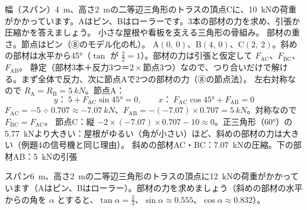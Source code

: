 \begin{phreidai}[三角トラスを節点法で解く]
\label{ph:力-5:ex11}幅（スパン）\qty{4}{m}、高さ\qty{2}{m}の二等辺三角形のトラスの頂点Cに、\qty{10}{kN}の荷重がかかっています。Aはピン、Bはローラーです。3本の部材の力を求め、引張か圧縮かを答えましょう。
\phbamen
小さな屋根や看板を支える三角形の骨組み。
\phmushi
部材の重さ。節点はピン（⑧のモデル化の札）。
\phzu
A$(0,\ 0)$、B$(4,\ 0)$、C$(2,\ 2)$。斜めの部材は水平から45°（$\tan$ が $\tfrac{2}{2}=1$）。部材の力は引張と仮定して $F_{\mathrm{AC}}$、$F_{\mathrm{BC}}$、$F_{\mathrm{AB}}$。
\phriyu
静定（部材3本＋反力3つ＝$2\times$節点3つ）なので、つり合いだけで解ける。まず全体で反力、次に節点Aで2つの部材の力（⑧の節点法）。
\phtateru
左右対称なので $R_{\mathrm A}=R_{\mathrm B}=\qty{5}{kN}$。節点A：
\[ y\text{：}\ 5+F_{\mathrm{AC}}\sin45°=0,\qquad x\text{：}\ F_{\mathrm{AC}}\cos45°+F_{\mathrm{AB}}=0 \]
\phtoku
$F_{\mathrm{AC}}=-5\div 0.707\approx\qty{-7.07}{kN}$、$F_{\mathrm{AB}}=-(-7.07)\times0.707=\qty{5}{kN}$。対称なので $F_{\mathrm{BC}}=F_{\mathrm{AC}}$。
\phtashikame
節点C：縦 $-2\times(-7.07)\times0.707-10\approx0$。\quad 正三角形（60°）の\qty{5.77}{kN}より大きい：屋根がゆるい（角が小さい）ほど、斜めの部材の力は大きい（例題4の信号機と同じ理由）。
\kotae 斜めの部材AC・BC：\qty{7.07}{kN}の圧縮。下の部材AB：\qty{5}{kN}の引張
\end{phreidai}
\begin{jibun}
スパン\qty{6}{m}、高さ\qty{2}{m}の二等辺三角形のトラスの頂点に\qty{12}{kN}の荷重がかかっています（Aはピン、Bはローラー）。部材の力を求めましょう（斜めの部材の水平からの角を $\alpha$ とすると、$\tan\alpha=\tfrac{2}{3}$、$\sin\alpha\approx0.555$、$\cos\alpha\approx0.832$）。
\end{jibun}

